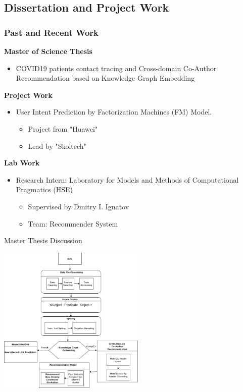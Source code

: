 \documentclass[smaller,aspectratio=169]{beamer}
\begin{document}
	\subsection{Dissertation and Project Work}
	\begin{frame}
	\frametitle{Past and Recent Work}
	\textbf{Master of Science Thesis}
		\begin{itemize}
			\item COVID19 patients contact tracing and Cross-domain Co-Author Recommendation based on Knowledge Graph Embedding
		\end{itemize}
		\textbf{Project Work}
		\begin{itemize}
			\item User Intent Prediction by Factorization Machines (FM) Model.
			\begin{itemize}
			    \item Project from "Huawei"
			    \item Lead by "Skoltech"
			\end{itemize}
		\end{itemize}
	\textbf{Lab Work}
	\begin{itemize}
	    \item Research Intern: Laboratory for Models and Methods of Computational Pragmatics (HSE)
	    \begin{itemize}
	        \item Supervised by Dmitry I. Ignatov
	        \item Team: Recommender System
	    \end{itemize}
	\end{itemize}
	\end{frame}
	
	\begin{frame}{Master Thesis Discussion}
	\begin{center}
	     \includegraphics[width=7cm]{img/KG_RecSys.png}
	\end{center}
	   
	\end{frame}
	
\end{document}
